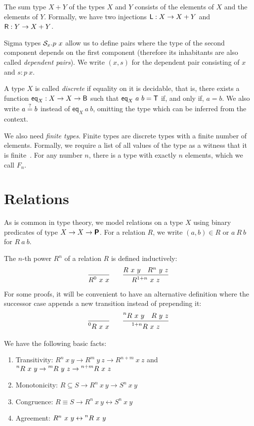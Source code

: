 The sum type $X + Y$ of the types $X$ and $Y$ consists of the elements of $X$ and the elements of $Y$. Formally, we have two injections $\textsf{L} : X \rightarrow X + Y$ and $\textsf{R} : Y \rightarrow X + Y$. 

Sigma types $\mathcal{S}_{x}.p~x$ allow us to define pairs where the type of the second component depends on the first component (therefore its inhabitants are also called \emph{dependent pairs}). We write $(x, s)$ for the dependent pair consisting of $x$ and $s : p~x$. 

A type $X$ is called \emph{discrete} if equality on it is decidable, that is, there exists a function $\textsf{eq}_X : X \rightarrow X \rightarrow \textsf{B}$ such that $\textsf{eq}_X~a~b = \mathsf{T}$ if, and only if, $a = b$. We also write $a\overset{?}{=}b$ instead of $\textsf{eq}_X~a~b$, omitting the type which can be inferred from the context. 

We also need \emph{finite types}. Finite types are discrete types with a finite number of elements. Formally, we require a list of all values of the type as a witness that it is finite~\cite{menz2016}.
For any number $n$, there is a type with exactly $n$ elements, which we call $F_n$. 

\section{Relations}
As is common in type theory, we model relations on a type $X$ using binary predicates of type $X \rightarrow X \rightarrow \textsf{\bfseries P}$. 
For a relation $R$, we write $(a, b) \in R$ or $a~R~b$ for $R~a~b$. 

The $n$-th power $R^n$ of a relation $R$ is defined inductively:
\begin{align*}
  \infer{R^0~x~x}{}
  \qquad
  \infer{R^{\natS{n}}~x~z}{R~x~y\quad R^n~y~z}
\end{align*}
For some proofs, it will be convenient to have an alternative definition where the successor case appends a new transition instead of prepending it:
\begin{align*}
  \infer{\prescript{0}{}R~x~x}{}
  \qquad
  \infer{\prescript{\natS{n}}{}R~x~z}{\prescript{n}{}R~x~y\quad R~y~z}
\end{align*}

\begin{proposition}\label{prop:relpower}
  We have the following basic facts:
  \begin{enumerate}
    \item Transitivity: $R^n~x~y \rightarrow R^m~y~z \rightarrow R^{n+m}~x~z$ and $\prescript{n}{}R~x~y \rightarrow \prescript{m}{}R~y~z \rightarrow \prescript{n+m}{}R~x~z$
    \item Monotonicity: $R \subseteq S \rightarrow R^n~x~y \rightarrow S^n~x~y$
    \item Congruence: $R \equiv S \rightarrow R^n~x~y \leftrightarrow S^n~x~y$
    \item Agreement: $R^n~x~y \leftrightarrow \prescript{n}{}R~x~y$
  \end{enumerate}
\end{proposition}

